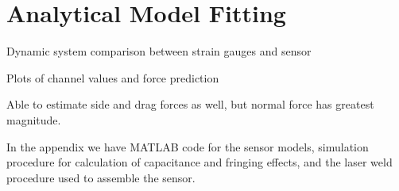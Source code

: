 \chapter{Analytical Model Fitting
\label{chap:extra_modeling}}

Dynamic system comparison between strain gauges and sensor

Plots of channel values and force prediction

Able to estimate side and drag forces as well, but normal force has greatest magnitude.

In the appendix we have MATLAB code for the sensor models,
simulation procedure for calculation of capacitance and fringing effects,
and the laser weld procedure used to assemble the sensor.

